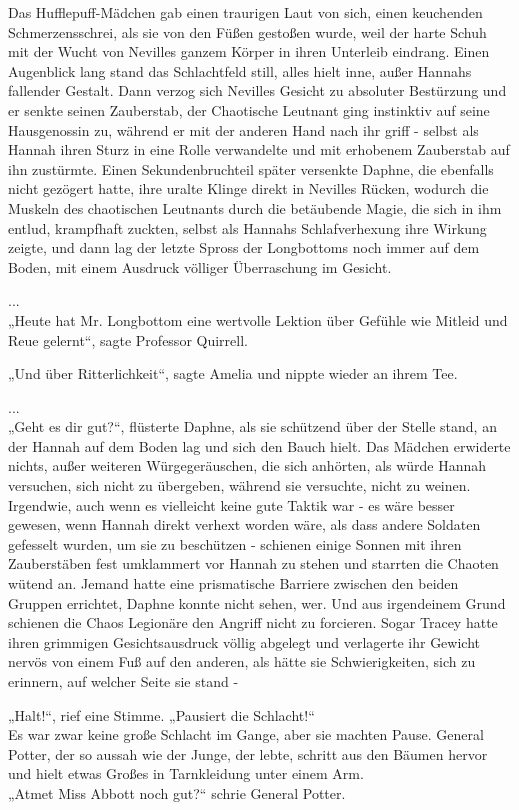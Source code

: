 {Das Hufflepuff-Mädchen gab einen traurigen Laut von sich, einen keuchenden Schmerzensschrei, als sie von den Füßen gestoßen wurde, weil der harte Schuh mit der Wucht von Nevilles ganzem Körper in ihren Unterleib eindrang. Einen Augenblick lang stand das Schlachtfeld still, alles hielt inne, außer Hannahs fallender Gestalt. Dann verzog sich Nevilles Gesicht zu absoluter Bestürzung und er senkte seinen Zauberstab, der Chaotische Leutnant ging instinktiv auf seine Hausgenossin zu, während er mit der anderen Hand nach ihr griff - selbst als Hannah ihren Sturz in eine Rolle verwandelte und mit erhobenem Zauberstab auf ihn zustürmte. Einen Sekundenbruchteil später versenkte Daphne, die ebenfalls nicht gezögert hatte, ihre uralte Klinge direkt in Nevilles Rücken, wodurch die Muskeln des chaotischen Leutnants durch die betäubende Magie, die sich in ihm entlud, krampfhaft zuckten, selbst als Hannahs Schlafverhexung ihre Wirkung zeigte, und dann lag der letzte Spross der Longbottoms noch immer auf dem Boden, mit einem Ausdruck völliger Überraschung im Gesicht.

...\\ „Heute hat Mr. Longbottom eine wertvolle Lektion über Gefühle wie Mitleid und Reue gelernt“, sagte Professor Quirrell.

„Und über Ritterlichkeit“, sagte Amelia und nippte wieder an ihrem Tee.

...\\ „Geht es dir gut?“, flüsterte Daphne, als sie schützend über der Stelle stand, an der Hannah auf dem Boden lag und sich den Bauch hielt. Das Mädchen erwiderte nichts, außer weiteren Würgegeräuschen, die sich anhörten, als würde Hannah versuchen, sich nicht zu übergeben, während sie versuchte, nicht zu weinen. Irgendwie, auch wenn es vielleicht keine gute Taktik war - es wäre besser gewesen, wenn Hannah direkt verhext worden wäre, als dass andere Soldaten gefesselt wurden, um sie zu beschützen - schienen einige Sonnen mit ihren Zauberstäben fest umklammert vor Hannah zu stehen und starrten die Chaoten wütend an. Jemand hatte eine prismatische Barriere zwischen den beiden Gruppen errichtet, Daphne konnte nicht sehen, wer. Und aus irgendeinem Grund schienen die Chaos Legionäre den Angriff nicht zu forcieren. Sogar Tracey hatte ihren grimmigen Gesichtsausdruck völlig abgelegt und verlagerte ihr Gewicht nervös von einem Fuß auf den anderen, als hätte sie Schwierigkeiten, sich zu erinnern, auf welcher Seite sie stand -

„Halt!“, rief eine Stimme. „Pausiert die Schlacht!“\\ Es war zwar keine große Schlacht im Gange, aber sie machten Pause. General Potter, der so aussah wie der Junge, der lebte, schritt aus den Bäumen hervor und hielt etwas Großes in Tarnkleidung unter einem Arm.\\ „Atmet Miss Abbott noch gut?“ schrie General Potter.

}
